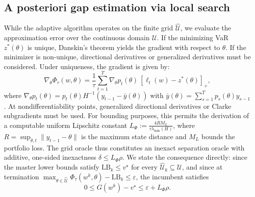 \documentclass[smallcondensed]{svjour3}
\begin{document}
\subsection{A posteriori gap estimation via local search}\label{sec:certification}
While the adaptive algorithm operates on the finite grid $\widehat{\mathcal{U}}$, we evaluate the approximation error over the continuous domain $\mathcal{U}$. If the minimizing VaR $z^*(\theta)$ is unique, Danskin's theorem yields the gradient with respect to $\theta$. If the minimizer is non-unique, directional derivatives or generalized derivatives must be considered. Under uniqueness, the gradient is given by:
\begin{equation}
\nabla_\theta \Phi_\tau(w,\theta) = \frac{1}{\tau}\sum_{t=1}^T \nabla_\theta p_t(\theta)\,[\ell_t(w) - z^*(\theta)]_+ ,
\end{equation}
where $\nabla_\theta p_t(\theta) = p_t(\theta) H^{-1}(y_{t-1} - \bar{y}(\theta))$ with $\bar{y}(\theta) = \sum_{s=1}^T p_s(\theta) y_{s-1}$. At nondifferentiability points, generalized directional derivatives or Clarke subgradients must be used. For bounding purposes, this permits the derivation of a computable uniform Lipschitz constant $L_\Phi := \frac{4 R M_L}{\tau \lambda_{\min}(H)}$, where $R = \sup_{\theta, t}\|y_{t-1} - \theta\|$ is the maximum state distance and $M_L$ bounds the portfolio loss. 
The grid oracle thus constitutes an inexact separation oracle with additive, one-sided inexactness $\delta \le L_\Phi \rho$. We state the consequence directly: since the master lower bounds satisfy $\mathrm{LB}_k \le v^\star$ for every $\widehat{\mathcal{U}}_k \subseteq \mathcal{U}$, and since at termination $\max_{\theta \in \widehat{\mathcal{U}}} \Phi_\tau(w^k,\theta) - \mathrm{LB}_k \le \varepsilon$, the incumbent satisfies
\begin{equation}
0 \le G(w^k) - v^\star \le \varepsilon + L_\Phi \rho .
\end{equation}
\end{document}
